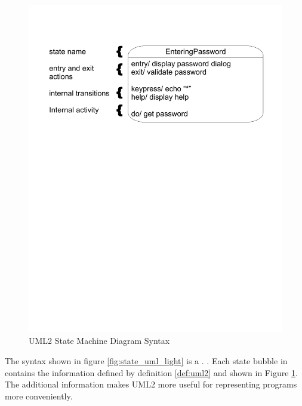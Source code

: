 \begin{figure}[htp]
    \centering
    \includegraphics[trim= 15mm 175mm 15mm 10mm, clip, width=\imgmedium]{./images/state_uml2_syntax_21_4.pdf} 
    \caption{UML2 State Machine Diagram Syntax \cite{UML2}}
    \label{fig:state_uml2}
\end{figure}

The syntax shown in figure \ref{fig:state_uml_light} is a  \cite{UML2}.  \cite{UML2}. Each state bubble in   \cite{UML2} contains the information defined by definition \ref{def:uml2} and shown in Figure \ref{fig:state_uml2}. The additional information makes UML2 more useful for representing programs more conveniently.

